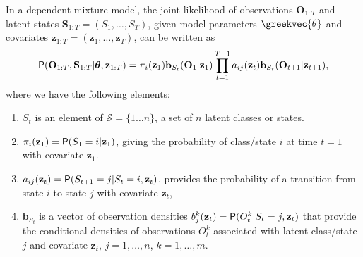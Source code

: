 \documentclass[article]{jss}
\newcommand{\vc}{\mathbf}
\newcommand{\greekv}[1]{\mbox{\boldmath$\mathrm{#1}$}}
\begin{document}
In a dependent mixture model, the joint likelihood of observations $\vc{O}_{1:T}$ and 
latent states $\vc{S}_{1:T} = (S_1,\ldots,S_T)$, given model parameters 
$\greekvec{\theta}$ and covariates $\vc{z}_{1:T} = (\vc{z}_1,\ldots,\vc{z}_T)$, 
can be written as
\begin{equation}
	\Prob(\vc{O}_{1:T},\vc{S}_{1:T}|\greekv{\theta},\vc{z}_{1:T}) =  
	\pi_{i}(\vc{z}_1) \vc{b}_{S_t}(\vc{O}_1|\vc{z}_{1})
	\prod_{t=1}^{T-1} a_{ij}(\vc{z}_{t}) \vc{b}_{S_t}(\vc{O}_{t+1}|\vc{z}_{t+1}),
\end{equation}
where we have the following elements:
\begin{enumerate}
	
	\item $S_{t}$ is an element of $\mathcal{S}=\{1\ldots n\}$, a set
	of $n$ latent classes or states. %
	
	\item $\pi_{i}(\vc{z}_1) = \Prob(S_1 = i|\vc{z}_1)$,
	giving the probability of class/state $i$ at time $t=1$ with
	covariate $\vc{z}_1$.
	
	\item $a_{ij}(\vc{z}_t) = \Prob(S_{t+1}=j|S_{t}=i,\vc{z}_t)$,
	provides the probability of a transition from state $i$ to state
	$j$ with covariate $\vc{z}_t$,
	
	\item $\vc{b}_{S_t}$ is a vector of observation densities
	$b_{j}^k(\vc{z}_t) = \Prob(O_{t}^k|S_t = j, \vc{z}_t)$ that provide the
	conditional densities of observations $O_{t}^k$ associated with
	latent class/state $j$ and covariate $\vc{z}_t$, $j=1, \ldots, n$,
	$k=1, \ldots, m$. 
\end{enumerate}

\end{document}
